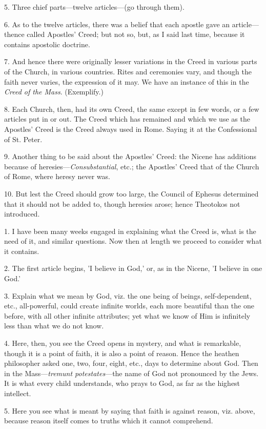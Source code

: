 5. Three chief parts—twelve articles—(go
through them).

6. As to the twelve articles, there was a belief
that each apostle gave an article—thence called Apostles'
Creed; but not so, but, as I said last time, because it contains
apostolic doctrine.

7. And hence there were originally lesser
variations in the Creed in various parts of the Church, in various
countries. Rites and ceremonies vary, and though the faith never
varies, the expression of it may. We have an instance of this in the \emph{Creed
of the Mass}. (Exemplify.)

8. Each Church, then, had its own Creed, the same
except in few words, or a few articles put in or out. The Creed which
has remained and which we use as the Apostles' Creed is the Creed
always used in Rome. Saying it at the Confessional of St. Peter.

9. Another thing to be said about the Apostles'
Creed: the Nicene has additions because of heresies—\emph{Consubstantial},
etc.; the Apostles' Creed that of the Church of Rome, where heresy
never was.

10. But lest the Creed should grow too large, the
Council of Ephesus determined that it should not be added to, though
heresies arose; hence Theotokos not introduced.


1. I have been many weeks engaged in explaining
what the Creed is, what is the need of it, and similar questions. Now
then at length we proceed to consider what it contains.

2. The first article begins, 'I believe in God,'
or, as in the Nicene, 'I believe in one God.'

3. Explain what we mean by God, viz. the one
being of beings, self-dependent, etc., all-powerful, could create
infinite worlds, each more beautiful than the one before, with all
other infinite attributes; yet what we know of Him is infinitely less
than what we do not know.

4. Here, then, you see the Creed opens in
mystery, and what is remarkable, though it is a point of faith, it is
also a point of reason. Hence the heathen philosopher asked one, two,
four, eight, etc., days to determine about God. Then in the Mass—\emph{tremunt
potestates}—the name of God not pronounced by the Jews. It is
what every child understands, who prays to God, as far as the highest
intellect.

5. Here you see what is meant by saying that
faith is against reason, viz. above, because reason itself comes to
truths which it cannot comprehend.

